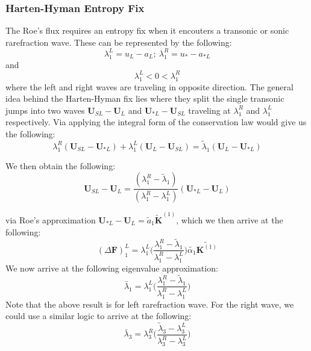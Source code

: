 \documentclass[a4paper]{article}
\numberwithin{equation}{section}
\begin{document}
\subsubsection{Harten-Hyman Entropy Fix}

The Roe's flux requires an entropy fix when it encouters a transonic or sonic rarefraction wave. These can be represented by the following:
\begin{equation}
    \lambda_1^L = u_L - a_L; \ \lambda_1^R = u_* - a_{*L}
\end{equation}
and 
\begin{equation} \label{eq:LeftRarefractionWaveCondition}
    \lambda_1^L < 0 < \lambda_1^R
\end{equation}
where the left and right waves are traveling in opposite direction. The general idea behind the Harten-Hyman fix lies where they split the single transonic jumps into two waves $\mathbf{U}_{SL} - \mathbf{U}_L$ and $\mathbf{U}_{*L} - \mathbf{U}_{SL}$ traveling at $\lambda_1^R$ and $\lambda_1^L$ respectively. Via applying the integral form of the conservation law would give us the following:
\begin{equation}
    \lambda_1^R (\mathbf{U}_{SL} - \mathbf{U}_{*L}) +     \lambda_1^L (\mathbf{U}_{L} - \mathbf{U}_{SL}) = \tilde{\lambda}_1 (\mathbf{U}_L - \mathbf{U}_{*L})
\end{equation}

We then obtain the following:
\begin{equation}
    \mathbf{U}_{SL} - \mathbf{U}_L = \frac{(\lambda_1^R - \tilde{\lambda}_1)}{(\lambda_1^R - \lambda_1^L)} (\mathbf{U}_{*L} - \mathbf{U}_L)
\end{equation}

via Roe's approximation $\mathbf{U}_{*L} - \mathbf{U}_L = \tilde{a}_1 {\tilde{\mathbf{K}}}^{(1)}$, which we then arrive at the following:
\begin{equation}
    (\Delta \mathbf{F})_1^L = \lambda_1^L \biggl(\frac{\lambda_1^R - \tilde{\lambda}_1}{\lambda_1^R - \lambda_1^L}
    \biggr) \tilde{\alpha_1} \tilde{\mathbf{K}^{(1)}}
\end{equation}
We now arrive at the following eigenvalue approximation:
\begin{equation}
    \bar{\lambda}_1 = \lambda_1^L \biggl(\frac{\lambda_1^R - \tilde{\lambda}_1}{\lambda_1^R - \lambda_1^L}
    \biggr)
\end{equation}
Note that the above result is for left rarefraction wave. For the right wave, we could use a similar logic to arrive at the following:
\begin{equation}
    \bar{\lambda}_3 = \lambda_3^R \biggl(\frac{
    \tilde{\lambda}_3 - \lambda_3^L }{\lambda_3^R - \lambda_3^L}\biggr)
\end{equation}
\end{document}
